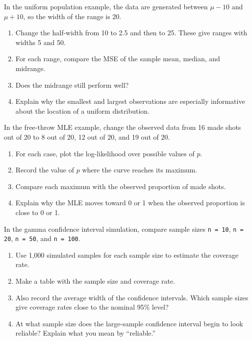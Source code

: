 \begin{exercise}
In the uniform population example, the data are generated between
$\mu - 10$ and $\mu + 10$, so the width of the range is 20.
\begin{enumerate}[label=(\alph*)]
\item Change the half-width from 10 to 2.5 and then to 25. These give
  ranges with widths 5 and 50.
\item For each range, compare the MSE of the sample mean, median, and
  midrange.
\item Does the midrange still perform well?
\item Explain why the smallest and largest observations are especially
  informative about the location of a uniform distribution.
\end{enumerate}
\end{exercise}

\begin{exercise}
In the free-throw MLE example, change the observed data from 16 made
shots out of 20 to 8 out of 20, 12 out of 20, and 19 out of 20.
\begin{enumerate}[label=(\alph*)]
\item For each case, plot the log-likelihood over possible values of
  $p$.
\item Record the value of $p$ where the curve reaches its maximum.
\item Compare each maximum with the observed proportion of made shots.
\item Explain why the MLE moves toward 0 or 1 when the observed
  proportion is close to 0 or 1.
\end{enumerate}
\end{exercise}

\begin{exercise}
In the gamma confidence interval simulation, compare sample sizes
\lstinline{n = 10}, \lstinline{n = 20}, \lstinline{n = 50}, and
\lstinline{n = 100}.
\begin{enumerate}[label=(\alph*)]
\item Use 1,000 simulated samples for each sample size to estimate the
  coverage rate.
\item Make a table with the sample size and coverage rate.
\item Also record the average width of the confidence intervals. Which
  sample sizes give coverage rates close to the nominal 95\% level?
\item At what sample size does the large-sample confidence interval
  begin to look reliable? Explain what you mean by ``reliable.''
\end{enumerate}
\end{exercise}

